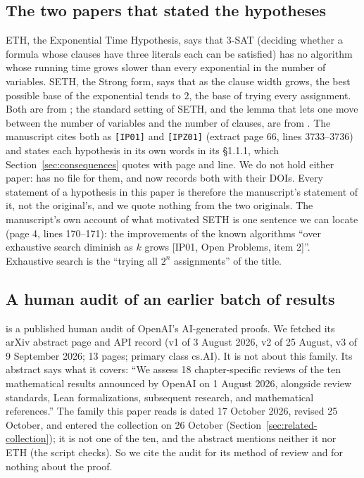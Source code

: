 \subsection{The two papers that stated the hypotheses}
\label{sec:related-hypotheses}

ETH, the Exponential Time Hypothesis, says that 3-SAT (deciding whether a
formula whose clauses have three literals each can be satisfied) has no
algorithm whose running time grows slower than every exponential in the
number of variables. SETH, the Strong form, says that as the clause width
grows, the best possible base of the exponential tends to $2$, the base of
trying every assignment. Both are from \citet{ImpagliazzoPaturi2001}; the
standard setting of SETH, and the lemma that lets one move between the
number of variables and the number of clauses, are from
\citet{ImpagliazzoPaturiZane2001}. The manuscript cites both as
\texttt{[IP01]} and \texttt{[IPZ01]} (extract page 66, lines 3733--3736)
and states each hypothesis in its own words in its \S1.1.1, which
Section~\ref{sec:consequences} quotes with page and line. We do not hold
either paper:  has no file for them, and
 now records both with their DOIs. Every
statement of a hypothesis in this paper is therefore the manuscript's
statement of it, not the original's, and we quote nothing from the two
originals. The manuscript's own account of what motivated SETH is one
sentence we can locate (page 4, lines 170--171): the improvements of the
known algorithms ``over exhaustive search diminish as $k$ grows [IP01,
Open Problems, item 2]''. Exhaustive search is the ``trying all $2^n$
assignments'' of the title.

\subsection{A human audit of an earlier batch of results}
\label{sec:related-audit}

\citet{SienickiSienicki2026} is a published human audit of OpenAI's
AI-generated proofs. We fetched its arXiv abstract page and API record
(v1 of 3 August 2026, v2 of 25 August, v3 of 9 September 2026; 13 pages;
primary class cs.AI). It is not about this family. Its abstract says
what it covers: ``We assess 18 chapter-specific reviews of the ten
mathematical results announced by OpenAI on 1 August 2026, alongside
review standards, Lean formalizations, subsequent research, and
mathematical references.'' The family this paper reads is dated 17
October 2026, revised 25 October, and entered the collection on 26
October (Section~\ref{sec:related-collection}); it is not one of the ten,
and the abstract mentions neither it nor ETH (the script checks). So we
cite the audit for its method of review and for nothing about the proof.

